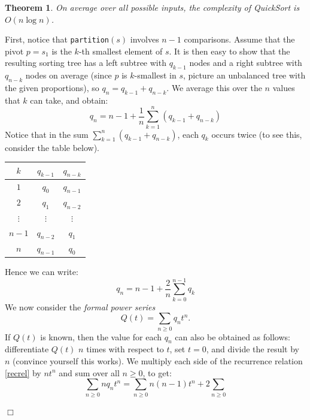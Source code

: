 \documentclass[a4paper]{book}
\theoremstyle{changebreak}                %
\newtheorem{thm}[result]{Theorem}
\newenvironment{proof}
 {{\sl Proof.}\hspace*{1 ex}}%
 {{\nopagebreak\hspace*{\fill}$\Box$\par\vspace{12pt}}}
\begin{document}
\begin{thm}
On average over all possible inputs, the complexity of {\sc QuickSort}
is $O(n\log n)$.
\end{thm}
\begin{proof}
First, notice that {\tt partition}$(s)$ involves $n-1$
comparisons. Assume that the pivot
$p=s_1$ is the $k$-th smallest element of $s$. It is then easy to show
that the resulting sorting tree has a left
subtree with $q_{k-1}$ nodes and a
right subtree with $q_{n-k}$ nodes on average
(since $p$ is $k$-smallest in $s$, picture an unbalanced
tree with the given proportions), so
$q_n=q_{k-1}+q_{n-k}$. We average this over the $n$ values that $k$
can take, and obtain:
\begin{equation*}
  q_n = n-1 + \frac{1}{n} \sum_{k=1}^n (q_{k-1}+q_{n-k})
\end{equation*}
 Notice that in the sum $\sum_{k=1}^n (q_{k-1}+q_{n-k})$, each $q_k$
 occurs twice (to see this, consider the table below).
\begin{center}
\begin{tabular}{c|c|c}
 $k$ & $q_{k-1}$ & $q_{n-k}$ \\ \hline
  $1$  & $q_0$ & $q_{n-1}$ \\ 
  $2$  & $q_1$ & $q_{n-2}$ \\
  $\vdots$ & $\vdots$ & $\vdots$ \\
  $n-1$ & $q_{n-2}$ & $q_1$ \\
  $n$ & $q_{n-1}$ & $q_0$ 
\end{tabular}
\end{center}
Hence we can write:
\begin{equation}
  q_n = n-1 + \frac{2}{n} \sum_{k=0}^{n-1} q_k \label{recrel}
\end{equation}
We now consider the {\it formal power series}
\begin{equation} 
  Q(t) = \sum_{n\ge 0} q_n t^n. \label{powser}
\end{equation}
If $Q(t)$ is known, then the value for each $q_n$ can also be obtained
as follows: differentiate $Q(t)$ $n$ times with respect to $t$, set
$t=0$, and divide the result by $n$ (convince yourself this works).
We multiply each side of the recurrence relation \eqref{recrel} by
$nt^n$ and sum over all $n\ge 0$, to get:
\begin{equation*}
  \sum_{n\ge 0} nq_nt^n = \sum_{n\ge 0} n(n-1)t^n + 2\sum_{n\ge 0}

\end{equation*}
\end{proof}
\end{document}

